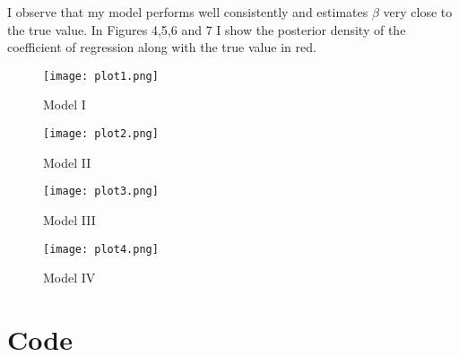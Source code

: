 \documentclass{article}
\begin{document}
I observe that my model performs well consistently and estimates $\beta$ very close to the true value. In Figures 4,5,6 and 7 I show the posterior density of the coefficient of regression along with the true value in red.
 \begin{figure}[H]
\centering
\texttt{[image: plot1.png]}
\caption{Model I}
\label{deltat}
\end{figure}
 \begin{figure}[H]
\centering
\texttt{[image: plot2.png]}
\caption{Model II}
\label{deltat}
\end{figure}
 \begin{figure}[H]
\centering
\texttt{[image: plot3.png]}
\caption{Model III}
\label{deltat}
\end{figure}
 \begin{figure}[H]
\centering
\texttt{[image: plot4.png]}
\caption{Model IV}
\label{deltat}
\end{figure}

\section{Code}
\end{document}
